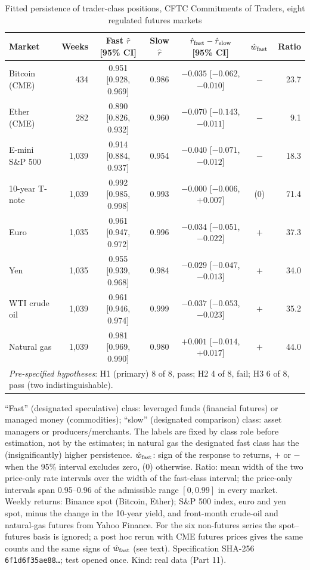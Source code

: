 \documentclass[12pt]{article}
\theoremstyle{definition}
\theoremstyle{remark}
\begin{document}
\begin{table}[t]\centering\small
\begin{threeparttable}
\caption{Fitted persistence of trader-class positions, CFTC Commitments of Traders, eight regulated futures markets}\label{tab:cot}
\setlength{\tabcolsep}{2.2pt}\footnotesize
\begin{tabular}{lrccccr}
\toprule
Market & Weeks & Fast $\hat r$ [95\% CI] & Slow $\hat r$ & $\hat r_{\rm fast}-\hat r_{\rm slow}$ [95\% CI] & $\hat w_{\rm fast}$ & Ratio\\
\midrule
Bitcoin (CME) & 434 & 0.951 [0.928, 0.969] & 0.986 & $-0.035$ [$-0.062$, $-0.010$] & $-$ & 23.7\\
Ether (CME) & 282 & 0.890 [0.826, 0.932] & 0.960 & $-0.070$ [$-0.143$, $-0.011$] & $-$ & 9.1\\
E-mini S\&P 500 & 1{,}039 & 0.914 [0.884, 0.937] & 0.954 & $-0.040$ [$-0.071$, $-0.012$] & $-$ & 18.3\\
10-year T-note & 1{,}039 & 0.992 [0.985, 0.998] & 0.993 & $-0.000$ [$-0.006$, $+0.007$] & (0) & 71.4\\
Euro & 1{,}035 & 0.961 [0.947, 0.972] & 0.996 & $-0.034$ [$-0.051$, $-0.022$] & $+$ & 37.3\\
Yen & 1{,}035 & 0.955 [0.939, 0.968] & 0.984 & $-0.029$ [$-0.047$, $-0.013$] & $+$ & 34.0\\
WTI crude oil & 1{,}039 & 0.961 [0.946, 0.974] & 0.999 & $-0.037$ [$-0.053$, $-0.023$] & $+$ & 35.2\\
Natural gas & 1{,}039 & 0.981 [0.969, 0.990] & 0.980 & $+0.001$ [$-0.014$, $+0.017$] & $+$ & 44.0\\
\midrule
\multicolumn{7}{l}{\emph{Pre-specified hypotheses}: H1 (primary) 8 of 8, pass; H2 4 of 8, fail; H3 6 of 8, pass (two indistinguishable).}\\
\bottomrule
\end{tabular}
\begin{tablenotes}\footnotesize\item ``Fast'' (designated speculative) class: leveraged funds (financial futures) or managed money (commodities); ``slow'' (designated comparison) class: asset managers or producers/merchants. The labels are fixed by class role before estimation, not by the estimates; in natural gas the designated fast class has the (insignificantly) higher persistence. $\hat w_{\rm fast}$: sign of the response to returns, $+$ or $-$ when the 95\% interval excludes zero, (0) otherwise. Ratio: mean width of the two price-only rate intervals over the width of the fast-class interval; the price-only intervals span 0.95--0.96 of the admissible range $[0,0.99]$ in every market. Weekly returns: Binance spot (Bitcoin, Ether); S\&P 500 index, euro and yen spot, minus the change in the 10-year yield, and front-month crude-oil and natural-gas futures from Yahoo Finance. For the six non-futures series the spot--futures basis is ignored; a post hoc rerun with CME futures prices gives the same counts and the same signs of $\hat w_{\rm fast}$ (see text). Specification SHA-256 \texttt{6f1d6f35ae88\ldots}; test opened once. Kind: real data (Part 11).\end{tablenotes}
\end{threeparttable}
\end{table}
\end{document}
